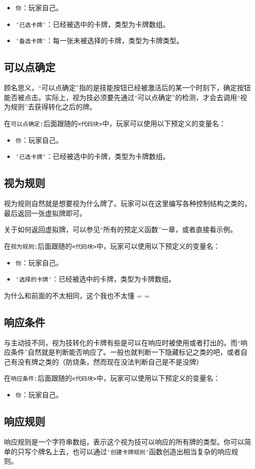 \begin{itemize}
 \item \verb|你|：玩家自己。
 \item \verb|'已选卡牌'|：已经被选中的卡牌，类型为卡牌数组。
 \item \verb|'备选卡牌'|：每一张未被选择的卡牌，类型为卡牌类型。
\end{itemize}

\subsection{可以点确定}

顾名思义，“可以点确定”指的是技能按钮已经被激活后的某一个时刻下，确定按钮能否被点击。实际上，视为技必须要先通过“可以点确定”的检测，才会去调用“视为规则”去获得转化之后的牌。

在\verb|可以点确定:|后面跟随的\verb|<代码块>|中，玩家可以使用以下预定义的变量名：

\begin{itemize}
 \item \verb|你|：玩家自己。
 \item \verb|'已选卡牌'|：已经被选中的卡牌，类型为卡牌数组。
\end{itemize}

\subsection{视为规则}

视为规则自然就是想要视为什么牌了。玩家可以在这里编写各种控制结构之类的，最后返回一张虚拟牌即可。

关于如何返回虚拟牌，可以参见“所有的预定义函数”一章，或者直接看示例。

在\verb|视为规则:|后面跟随的\verb|<代码块>|中，玩家可以使用以下预定义的变量名：

\begin{itemize}
 \item \verb|你|：玩家自己。
 \item \verb|'选择的卡牌'|：已经被选中的卡牌，类型为卡牌数组。
\end{itemize}

为什么和前面的不太相同，这个我也不太懂 = =

\subsection{响应条件}

与主动技不同，视为技转化的卡牌有些是可以在响应时被使用或者打出的。而“响应条件”自然就是判断能否响应了。一般也就判断一下隐藏标记之类的吧，或者自己有没有牌之类的（防烧条，然而现在没法判断自己是不是没牌）

在\verb|响应条件:|后面跟随的\verb|<代码块>|中，玩家可以使用以下预定义的变量名：

\begin{itemize}
 \item \verb|你|：玩家自己。
\end{itemize}

\subsection{响应规则}

响应规则是一个字符串数组，表示这个视为技可以响应的所有牌的类型。你可以简单的只写个牌名上去，也可以通过\verb|'创建卡牌规则'|函数创造出相当复杂的响应规则。
